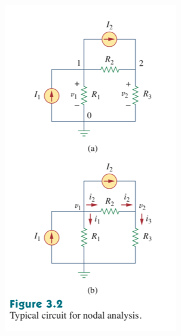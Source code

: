 \documentclass[11pt]{book}
\begin{document}
\begin{center}
	\includegraphics{figures/04.typical-nodal-circuit.png}
\end{center}
\end{document}

